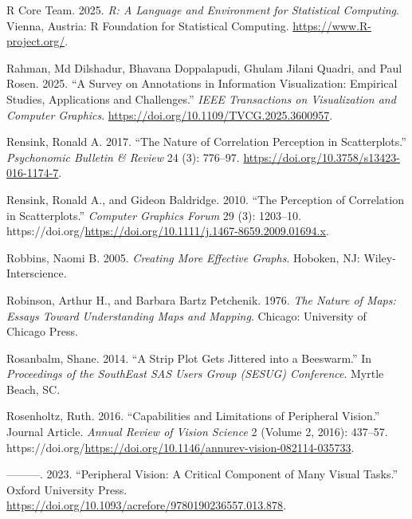 \documentclass[
  letterpaper,
  DIV=11,
  numbers=noendperiod]{scrreprt}
\newlength{\cslhangindent}
\newenvironment{CSLReferences}[2] %
 {\begin{list}{}{%
  \setlength{\itemindent}{0pt}
  \setlength{\leftmargin}{0pt}
  \setlength{\parsep}{0pt}
  \ifodd #1
   \setlength{\leftmargin}{\cslhangindent}
   \setlength{\itemindent}{-1\cslhangindent}
  \fi
  \setlength{\itemsep}{#2\baselineskip}}}
 {\end{list}}
\begin{document}
\begin{CSLReferences}{1}{0}
R Core Team. 2025. \emph{R: A Language and Environment for Statistical
Computing}. Vienna, Austria: R Foundation for Statistical Computing.
\url{https://www.R-project.org/}.

Rahman, Md Dilshadur, Bhavana Doppalapudi, Ghulam Jilani Quadri, and
Paul Rosen. 2025. {``A Survey on Annotations in Information
Visualization: Empirical Studies, Applications and Challenges.''}
\emph{IEEE Transactions on Visualization and Computer Graphics}.
\url{https://doi.org/10.1109/TVCG.2025.3600957}.

Rensink, Ronald A. 2017. {``The Nature of Correlation Perception in
Scatterplots.''} \emph{Psychonomic Bulletin \& Review} 24 (3): 776--97.
\url{https://doi.org/10.3758/s13423-016-1174-7}.

Rensink, Ronald A., and Gideon Baldridge. 2010. {``The Perception of
Correlation in Scatterplots.''} \emph{Computer Graphics Forum} 29 (3):
1203--10.
https://doi.org/\url{https://doi.org/10.1111/j.1467-8659.2009.01694.x}.

Robbins, Naomi B. 2005. \emph{Creating More Effective Graphs}. Hoboken,
NJ: Wiley-Interscience.

Robinson, Arthur H., and Barbara Bartz Petchenik. 1976. \emph{The Nature
of Maps: Essays Toward Understanding Maps and Mapping}. Chicago:
University of Chicago Press.

Rosanbalm, Shane. 2014. {``A Strip Plot Gets Jittered into a
Beeswarm.''} In \emph{Proceedings of the SouthEast SAS Users Group
(SESUG) Conference}. Myrtle Beach, SC.

Rosenholtz, Ruth. 2016. {``Capabilities and Limitations of Peripheral
Vision.''} Journal Article. \emph{Annual Review of Vision Science} 2
(Volume 2, 2016): 437--57.
https://doi.org/\url{https://doi.org/10.1146/annurev-vision-082114-035733}.

---------. 2023. {``Peripheral Vision: A Critical Component of Many
Visual Tasks.''} Oxford University Press.
\url{https://doi.org/10.1093/acrefore/9780190236557.013.878}.


\end{CSLReferences}
\end{document}
